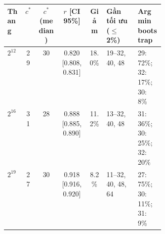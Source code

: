\begin{tabular}{lccccp{0.2\linewidth}p{0.17\linewidth}}
\toprule
Thang & $c^*$ & $c^*$ (median) & $r$ [CI 95\%] & Giảm & Gần tối ưu ($\le$2\%) & Argmin bootstrap \\
\midrule
$2^{12}$ & 29 & 30 & 0.820 [0.808, 0.831] & 18.0\% & 19--32, 40, 48 & 29: 72\%; 32: 17\%; 30: 8\% \\
$2^{16}$ & 31 & 28 & 0.888 [0.885, 0.890] & 11.2\% & 13--32, 40, 48 & 31: 36\%; 30: 25\%; 32: 20\% \\
$2^{19}$ & 27 & 30 & 0.918 [0.916, 0.920] & 8.2\% & 11--32, 40, 48, 64 & 27: 75\%; 30: 11\%; 31: 9\% \\
\bottomrule
\end{tabular}
